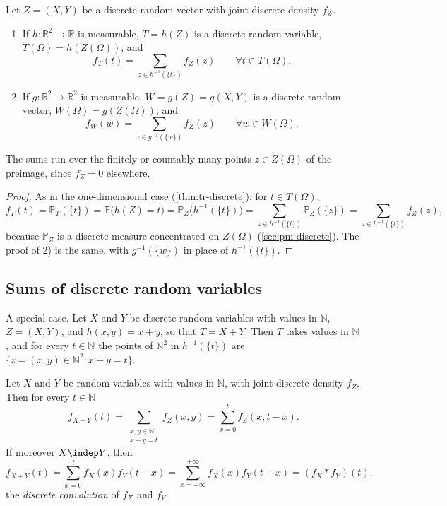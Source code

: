 \begin{proposition}\label{prop:rv-discrete}
Let $Z=(X,Y)$ be a discrete random vector with joint discrete density $f_Z$.
\begin{enumerate}[label=\arabic*)]
  \item If $h:\mathbb R^2\to\mathbb R$ is measurable, $T=h(Z)$ is a discrete random variable,
    $T(\Omega)=h(Z(\Omega))$, and
    \[
      f_T(t)=\sum_{z\in h^{-1}(\{t\})}f_Z(z)\qquad\forall t\in T(\Omega).
    \]
  \item If $g:\mathbb R^2\to\mathbb R^2$ is measurable, $W=g(Z)=g(X,Y)$ is a discrete random vector,
    $W(\Omega)=g(Z(\Omega))$, and
    \[
      f_W(w)=\sum_{z\in g^{-1}(\{w\})}f_Z(z)\qquad\forall w\in W(\Omega).
    \]
\end{enumerate}
The sums run over the finitely or countably many points $z\in Z(\Omega)$ of the preimage, since
$f_Z=0$ elsewhere.
\end{proposition}

\begin{proof}
As in the one-dimensional case (\cref{thm:tr-discrete}): for $t\in T(\Omega)$,
\[
  f_T(t)=\mathbb P_T(\{t\})=\mathbb P\big(h(Z)=t\big)=\mathbb P_Z\big(h^{-1}(\{t\})\big)
  =\sum_{z\in h^{-1}(\{t\})}\mathbb P_Z(\{z\})=\sum_{z\in h^{-1}(\{t\})}f_Z(z),
\]
because $\mathbb P_Z$ is a discrete measure concentrated on $Z(\Omega)$ (\cref{sec:pm-discrete}).
The proof of 2) is the same, with $g^{-1}(\{w\})$ in place of $h^{-1}(\{t\})$.
\end{proof}

\subsection{Sums of discrete random variables}\label{sec:rv-discrete-sums}

A special case. Let $X$ and $Y$ be discrete random variables with values in $\mathbb N$,
$Z=(X,Y)$, and $h(x,y)=x+y$, so that $T=X+Y$. Then $T$ takes values in $\mathbb N$, and for every
$t\in\mathbb N$ the points of $\mathbb N^2$ in $h^{-1}(\{t\})$ are
$\{z=(x,y)\in\mathbb N^2:x+y=t\}$.

\begin{proposition}\label{thm:rv-discrete-sum}
Let $X$ and $Y$ be random variables with values in $\mathbb N$, with joint discrete density $f_Z$.
Then for every $t\in\mathbb N$
\[
  f_{X+Y}(t)=\sum_{\substack{x,y\in\mathbb N\\x+y=t}}f_Z(x,y)=\sum_{x=0}^tf_Z(x,t-x).
\]
If moreover $X\indep Y$, then
\[
  f_{X+Y}(t)=\sum_{x=0}^tf_X(x)f_Y(t-x)=\sum_{x=-\infty}^{+\infty}f_X(x)f_Y(t-x)=(f_X*f_Y)(t),
\]
the \emph{discrete convolution} of $f_X$ and $f_Y$.
\end{proposition}

